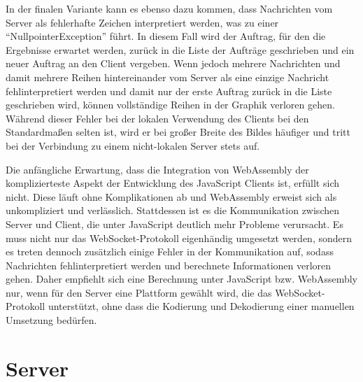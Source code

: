 \documentclass[12pt, onecolumn, notitlepage]{scrartcl}
\begin{document}
In der finalen Variante kann es ebenso dazu kommen, dass Nachrichten vom Server als fehlerhafte Zeichen interpretiert werden, was zu einer \enquote{NullpointerException} führt. In diesem Fall wird der Auftrag, für den die Ergebnisse erwartet werden, zurück in die Liste der Aufträge geschrieben und ein neuer Auftrag an den Client vergeben. Wenn jedoch mehrere Nachrichten und damit mehrere Reihen hintereinander vom Server als eine einzige Nachricht fehlinterpretiert werden und damit nur der erste Auftrag zurück in die Liste geschrieben wird, können vollständige Reihen in der Graphik verloren gehen. Während dieser Fehler bei der lokalen Verwendung des Clients bei den Standardmaßen selten ist, wird er bei großer Breite des Bildes häufiger und tritt bei der Verbindung zu einem nicht-lokalen Server stets auf. \par 

Die anfängliche Erwartung, dass die Integration von WebAssembly der komplizierteste Aspekt der Entwicklung des JavaScript Clients ist, erfüllt sich nicht. Diese läuft ohne Komplikationen ab und WebAssembly erweist sich als unkompliziert und verlässlich. Stattdessen ist es die Kommunikation zwischen Server und Client, die unter JavaScript deutlich mehr Probleme verursacht. Es muss nicht nur das WebSocket-Protokoll eigenhändig umgesetzt werden, sondern es treten dennoch zusätzlich einige Fehler in der Kommunikation auf, sodass Nachrichten fehlinterpretiert werden und berechnete Informationen verloren gehen. Daher empfiehlt sich eine Berechnung unter JavaScript bzw. WebAssembly nur, wenn für den Server eine Plattform gewählt wird, die das WebSocket-Protokoll unterstützt, ohne dass die Kodierung und Dekodierung einer manuellen Umsetzung bedürfen.


\section{Server}
\end{document}

